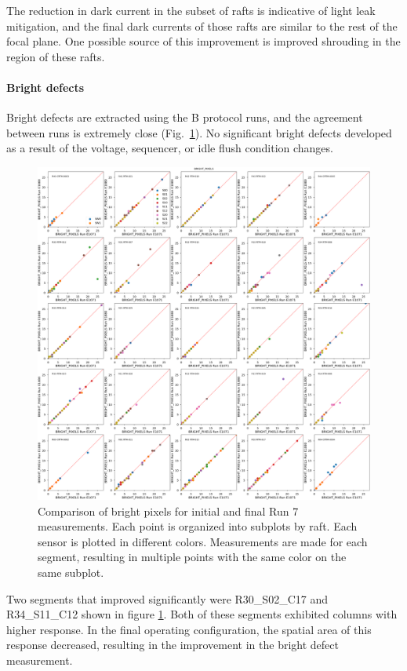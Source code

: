 The reduction in dark current in the subset of rafts is indicative of light leak mitigation, and the final dark currents of those rafts are similar to the rest of the focal plane. One possible source of this improvement is improved shrouding in the region of these rafts.

\clearpage

\paragraph{Bright defects}\label{final-bright-defects}

Bright defects are extracted using the B protocol runs, and the agreement between runs is extremely close (Fig.~\ref{fig:finalChar-BrightPixels-5x5}). No significant bright defects developed as a result of the voltage, sequencer, or idle flush condition changes.

\begin{figure}[ht]
    \centering
    \includegraphics[width=0.7\linewidth]{figures/finalCharacterization/E1071_E1880_BRIGHT_PIXELS.png}
    \caption{Comparison of bright pixels for initial and final Run 7 measurements. Each point is organized into subplots by raft. Each sensor is plotted in different colors. Measurements are made for each segment, resulting in multiple points with the same color on the same subplot.}
    \label{fig:finalChar-BrightPixels-5x5}
\end{figure}

Two segments that improved significantly were R30\_S02\_C17 and R34\_S11\_C12 shown in figure \ref{fig:finalChar-BrightPixels-5x5}. Both of these segments exhibited columns with higher response. In the final operating configuration, the spatial area of this response decreased, resulting in the improvement in the bright defect measurement.


